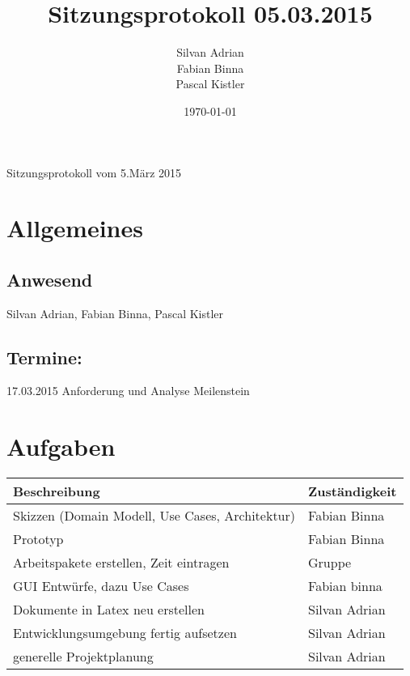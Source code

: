 \documentclass[11pt]{scrartcl}
\title{Sitzungsprotokoll 05.03.2015}
\author{Silvan Adrian \\ Fabian Binna \\ Pascal Kistler}
\date{\today{}}
\begin{document}
{\huge Sitzungsprotokoll vom 5.März 2015}

\section{Allgemeines}
\label{sec:Allgemein}

\subsection{Anwesend}
\label{sec:Anwesend}
Silvan Adrian, Fabian Binna, Pascal Kistler

\subsection{Termine:}
\label{sec:Termine}
17.03.2015 Anforderung und Analyse Meilenstein
\section{Aufgaben}
\label{sec:Aufgaben}
\begin{table}[h]
\begin{tabularx}{\textwidth}{X l }
\textbf{Beschreibung}  & \textbf{Zuständigkeit} \\
\hline
Skizzen (Domain Modell, Use Cases, Architektur) & Fabian Binna\\
\hline
Prototyp & Fabian Binna \\
\hline
Arbeitspakete erstellen, Zeit eintragen & Gruppe \\
\hline
GUI Entwürfe, dazu Use Cases & Fabian binna \\
\hline
Dokumente in Latex neu erstellen & Silvan Adrian \\
\hline
Entwicklungsumgebung fertig aufsetzen & Silvan Adrian \\
\hline
generelle Projektplanung & Silvan Adrian \\
\end{tabularx}
\end{table}
\end{document}
